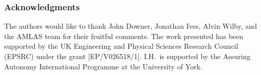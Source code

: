 \documentclass[runningheads]{llncs}
\begin{document}

\subsubsection*{Acknowledgments}
The authors would like to thank John Downer, Jonathan Ives, Alvin Wilby, and the AMLAS team for their fruitful comments. The work presented has been supported by the UK Engineering and Physical Sciences Research Council (EPSRC) under the grant [EP/V026518/1]. 
I.H.\ is supported by the Assuring Autonomy International Programme at the University of York.

%
%
%

%
\end{document}
